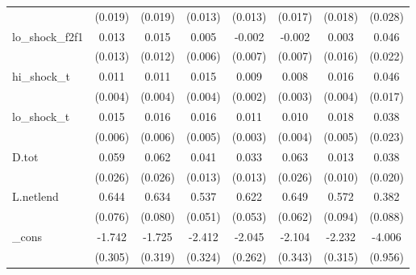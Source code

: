 {\begin{tabular}{l*{7}{c}}
            &     (0.019)         &     (0.019)         &     (0.013)         &     (0.013)         &     (0.017)         &     (0.018)         &     (0.028)         \\
\addlinespace
lo\_shock\_f2f1&       0.013         &       0.015         &       0.005         &      -0.002         &      -0.002         &       0.003         &       0.046\sym{**} \\
            &     (0.013)         &     (0.012)         &     (0.006)         &     (0.007)         &     (0.007)         &     (0.016)         &     (0.022)         \\
\addlinespace
hi\_shock\_t  &       0.011\sym{***}&       0.011\sym{***}&       0.015\sym{***}&       0.009\sym{***}&       0.008\sym{**} &       0.016\sym{***}&       0.046\sym{**} \\
            &     (0.004)         &     (0.004)         &     (0.004)         &     (0.002)         &     (0.003)         &     (0.004)         &     (0.017)         \\
\addlinespace
lo\_shock\_t  &       0.015\sym{**} &       0.016\sym{**} &       0.016\sym{***}&       0.011\sym{***}&       0.010\sym{**} &       0.018\sym{***}&       0.038         \\
            &     (0.006)         &     (0.006)         &     (0.005)         &     (0.003)         &     (0.004)         &     (0.005)         &     (0.023)         \\
\addlinespace
D.tot       &       0.059\sym{**} &       0.062\sym{**} &       0.041\sym{***}&       0.033\sym{**} &       0.063\sym{**} &       0.013         &       0.038\sym{*}  \\
            &     (0.026)         &     (0.026)         &     (0.013)         &     (0.013)         &     (0.026)         &     (0.010)         &     (0.020)         \\
\addlinespace
L.netlend   &       0.644\sym{***}&       0.634\sym{***}&       0.537\sym{***}&       0.622\sym{***}&       0.649\sym{***}&       0.572\sym{***}&       0.382\sym{***}\\
            &     (0.076)         &     (0.080)         &     (0.051)         &     (0.053)         &     (0.062)         &     (0.094)         &     (0.088)         \\
\addlinespace
\_cons      &      -1.742\sym{***}&      -1.725\sym{***}&      -2.412\sym{***}&      -2.045\sym{***}&      -2.104\sym{***}&      -2.232\sym{***}&      -4.006\sym{***}\\
            &     (0.305)         &     (0.319)         &     (0.324)         &     (0.262)         &     (0.343)         &     (0.315)         &     (0.956)         \\

\end{tabular}}
